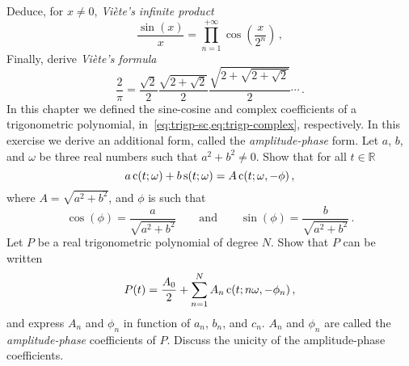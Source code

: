 \begin{ExerciseList}
  \Question Deduce, for $x\neq 0$, \emph{Viète's infinite product}
  \begin{equation}
    \frac{\sin(x)}{x}=\prod_{n=1}^{+\infty}\cos\left(\frac{x}{2^n}\right)\,,
  \end{equation}
  \Question Finally, derive \emph{Viète's formula}
  \begin{equation}
    \frac{2}{\pi}=\frac{\sqrt{2}}{2}\frac{\sqrt{2+\sqrt{2}}}{2}\frac{\sqrt{2+\sqrt{2+\sqrt{2}}
    }}{2}\cdots\,.
  \end{equation}
  \Exercise[label=ampphase]
  In this chapter we defined the sine-cosine and complex coefficients of a trigonometric polynomial,
  in~\cref{eq:trigp-sc,eq:trigp-complex}, respectively. In this exercise we derive an additional form, called the \emph{amplitude-phase} form.
  \Question Let $a$, $b$, and $\omega$ be three real numbers such that $a^2+b^2\neq0$. Show that for all $t\in\mathbb{R}$
  \begin{equation}
    a\operatorname{c}(t;\omega)+b\operatorname{s}(t;\omega)=A\operatorname{c}(t;\omega,-\phi)\,,
  \end{equation}
  where $A=\sqrt{a^2+b^2}$, and $\phi$ is such that
  \begin{equation}
    \cos(\phi)=\frac{a}{\sqrt{a^2+b^2}}\qquad\text{and}\qquad
    \sin(\phi)=\frac{b}{\sqrt{a^2+b^2}}\,.
  \end{equation}
  \Question Let $P$ be a real trigonometric polynomial of degree $N$. Show that $P$ can be written
  \begin{equation}
    P(t)=\frac{A_0}{2}+\sum_{n=1}^NA_n\operatorname{c}(t;n\omega,-\phi_n)\,,
  \end{equation}
  and express $A_n$ and $\phi_n$ in function of $a_n$, $b_n$, and $c_n$. $A_n$ and $\phi_n$ are called the \emph{amplitude-phase} coefficients of $P$.
  \Question Discuss the unicity of the amplitude-phase coefficients.
\end{ExerciseList}

